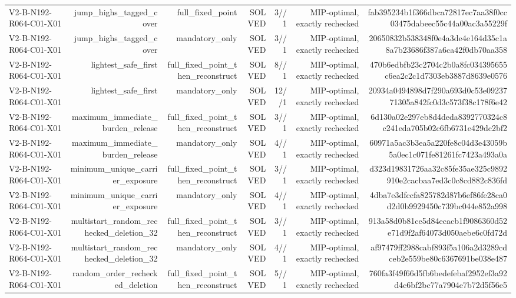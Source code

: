 {\begin{longtable}{lrrrrrr}
V2-B-N192-R064-C01-X01 & jump\_highs\_tagged\_cover & full\_fixed\_point & SOLVED & 3//1 & MIP-optimal, exactly rechecked & fab395234b1f366dbca72817ec7aa38f0cc03475dabeec55c44a00ac3a55229f \\
V2-B-N192-R064-C01-X01 & jump\_highs\_tagged\_cover & mandatory\_only & SOLVED & 3//1 & MIP-optimal, exactly rechecked & 20650832b538348f0e4a3de4e164d35c1a8a7b23686f387a6ca42f0db70aa358 \\
V2-B-N192-R064-C01-X01 & lightest\_safe\_first & full\_fixed\_point\_then\_reconstruct & SOLVED & 8//1 & MIP-optimal, exactly rechecked & 470b6edbfb23c2704c2b0a8fc034395655c6ea2c2c1d7303eb3887d8639e0576 \\
V2-B-N192-R064-C01-X01 & lightest\_safe\_first & mandatory\_only & SOLVED & 12//1 & MIP-optimal, exactly rechecked & 20934a0494898d7f290a693d0c53e0923771305a842fc0d3c573f38c178f6e42 \\
V2-B-N192-R064-C01-X01 & maximum\_immediate\_burden\_release & full\_fixed\_point\_then\_reconstruct & SOLVED & 3//1 & MIP-optimal, exactly rechecked & 6d130a02e297eb8d4deda8392770324c8c241eda705b02c6fb6731e429dc2bf2 \\
V2-B-N192-R064-C01-X01 & maximum\_immediate\_burden\_release & mandatory\_only & SOLVED & 4//1 & MIP-optimal, exactly rechecked & 60971a5ac3b3ea5a220fe8c04d3e43059b5a0ec1c071fe81261fc7423a493a0a \\
V2-B-N192-R064-C01-X01 & minimum\_unique\_carrier\_exposure & full\_fixed\_point\_then\_reconstruct & SOLVED & 3//1 & MIP-optimal, exactly rechecked & d323d19831726aa32c85fe35ae325c9892910e2cacbaa7ed3c0c8cd882c836fd \\
V2-B-N192-R064-C01-X01 & minimum\_unique\_carrier\_exposure & mandatory\_only & SOLVED & 4//1 & MIP-optimal, exactly rechecked & 4dba7e3dfccfa825782d87b6ef86fe28ca0d2d0b9929450c739bc044e852a998 \\
V2-B-N192-R064-C01-X01 & multistart\_random\_rechecked\_deletion\_32 & full\_fixed\_point\_then\_reconstruct & SOLVED & 3//1 & MIP-optimal, exactly rechecked & 913a58d0b81ce5d84ecacb1f9086360d52e71d9f2af64073d050aebe6c0fd72d \\
V2-B-N192-R064-C01-X01 & multistart\_random\_rechecked\_deletion\_32 & mandatory\_only & SOLVED & 4//1 & MIP-optimal, exactly rechecked & af97479ff2988cabf893f5a106a2d3289cdceb2e559be80c6367691be038e487 \\
V2-B-N192-R064-C01-X01 & random\_order\_rechecked\_deletion & full\_fixed\_point\_then\_reconstruct & SOLVED & 5//1 & MIP-optimal, exactly rechecked & 760fa3f49f66d5fb6bedefebaf2952ef3a92d4c6bf2bc77a7904e7b72d5f56e5 \\

\end{longtable}}
